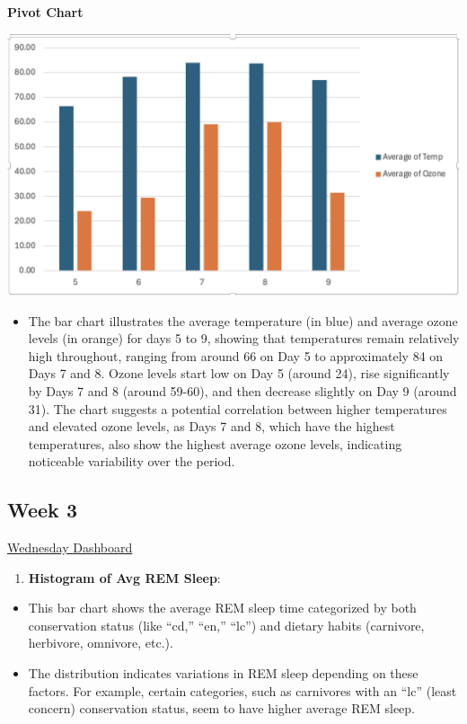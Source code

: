 \documentclass[
  letterpaper,
  DIV=11,
  numbers=noendperiod]{scrreprt}
\providecommand{\tightlist}{%
  \setlength{\itemsep}{0pt}\setlength{\parskip}{0pt}}\usepackage{longtable,booktabs,array}
\begin{document}
\textbf{Pivot Chart}

\includegraphics{pivot2_chart_baruga.png}

\begin{itemize}
\tightlist
\item
  The bar chart illustrates the average temperature (in blue) and
  average ozone levels (in orange) for days 5 to 9, showing that
  temperatures remain relatively high throughout, ranging from around 66
  on Day 5 to approximately 84 on Days 7 and 8. Ozone levels start low
  on Day 5 (around 24), rise significantly by Days 7 and 8 (around
  59-60), and then decrease slightly on Day 9 (around 31). The chart
  suggests a potential correlation between higher temperatures and
  elevated ozone levels, as Days 7 and 8, which have the highest
  temperatures, also show the highest average ozone levels, indicating
  noticeable variability over the period.
\end{itemize}

\subsection{Week 3}\label{week-3-2}

\href{https://public.tableau.com/views/Book1_17262574551960/Dashboard1?:language=en-US&publish=yes&:sid=&:redirect=auth&:display_count=n&:origin=viz_share_link}{Wednesday
Dashboard}

\begin{enumerate}
\def\labelenumi{\arabic{enumi}.}
\tightlist
\item
  \textbf{Histogram of Avg REM Sleep}:
\end{enumerate}

\begin{itemize}
\item
  This bar chart shows the average REM sleep time categorized by both
  conservation status (like ``cd,'' ``en,'' ``lc'') and dietary habits
  (carnivore, herbivore, omnivore, etc.).
\item
  The distribution indicates variations in REM sleep depending on these
  factors. For example, certain categories, such as carnivores with an
  ``lc'' (least concern) conservation status, seem to have higher
  average REM sleep.
\end{itemize}
\end{document}

